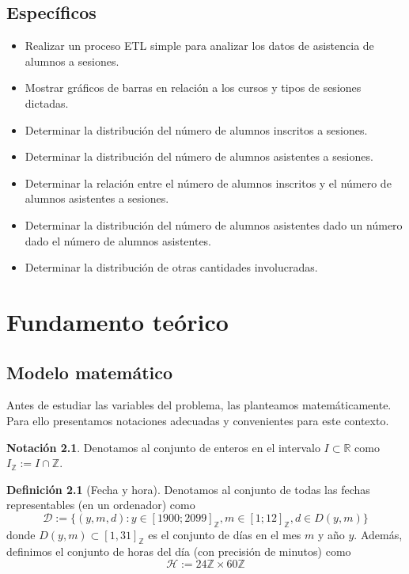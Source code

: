 \documentclass[11pt,a4paper]{book}
\theoremstyle{definition}%
\newtheorem{definicion}[teorema]{Definici\'on}
\newtheorem{notacion}[teorema]{Notaci\'on}
\newcommand{\Real}{\mathbb{R}}
\newcommand{\Integer}{\mathbb{Z}}
\begin{document}
            \section{Específicos}
                \begin{itemize}
                    \item Realizar un proceso ETL simple para analizar los datos de asistencia de alumnos a sesiones.
                    \item Mostrar gráficos de barras en relación a los cursos y tipos de sesiones dictadas.
                    \item Determinar la distribución del número de alumnos inscritos a sesiones.
                    \item Determinar la distribución del número de alumnos asistentes a sesiones.
                    \item Determinar la relación entre el número de alumnos inscritos y el número de alumnos asistentes a sesiones.
                    \item Determinar la distribución del número de alumnos asistentes dado un número dado el número de alumnos asistentes.
                    \item Determinar la distribución de otras cantidades involucradas.
                \end{itemize}
        \chapter{Fundamento teórico}
            \section{Modelo matemático}
            Antes de estudiar las variables del problema, las planteamos matemáticamente. Para ello presentamos notaciones adecuadas y convenientes para este contexto.

            \begin{notacion}
                Denotamos al conjunto de enteros en el intervalo $I\subset\Real$ como $I_\mathbb{Z}:=I\cap\mathbb{Z}$.
            \end{notacion}
            
            \begin{definicion}[Fecha y hora]
                Denotamos al conjunto de todas las fechas representables (en un ordenador) como
                \begin{equation*}
                    \mathcal{D}:=\{(y,m,d):y\in [1900;2099]_\Integer, m\in[1;12]_\Integer, d\in D(y,m)\}
                \end{equation*}
                donde $D(y,m)\subset[1,31]_\Integer$ es el conjunto de días en el mes $m$ y año $y$. Además, definimos el conjunto de horas del día (con precisión de minutos) como
                \begin{equation*}
                    \mathcal{H}:=24\Integer\times 60\Integer
                \end{equation*}
            \end{definicion}
            
\end{document}

